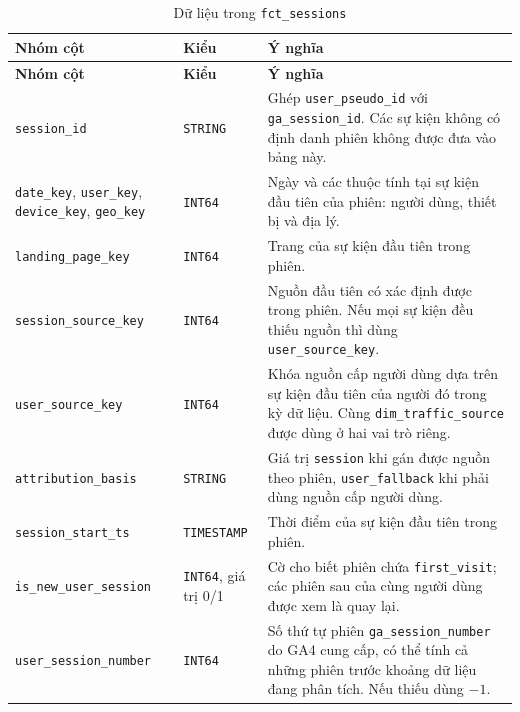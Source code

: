 \begin{xltabular}{\textwidth}{>{\raggedright\arraybackslash}p{4.5cm} >{\raggedright\arraybackslash}p{2.2cm} >{\raggedright\arraybackslash}X}
\caption{Dữ liệu trong \texttt{fct\_sessions}}
\label{tab:fct-sessions-detail} \\
\hline
\textbf{Nhóm cột} & \textbf{Kiểu} & \textbf{Ý nghĩa} \\
\hline
\endfirsthead
\hline
\textbf{Nhóm cột} & \textbf{Kiểu} & \textbf{Ý nghĩa} \\
\hline
\endhead
\hline
\endfoot
\hline
\endlastfoot

\texttt{session\_id}
& \texttt{STRING}
& Ghép \texttt{user\_pseudo\_id} với \texttt{ga\_session\_id}. Các sự kiện không có định danh phiên không được đưa vào bảng này. \\

\texttt{date\_key}, \texttt{user\_key}, \texttt{device\_key}, \texttt{geo\_key}
& \texttt{INT64}
& Ngày và các thuộc tính tại sự kiện đầu tiên của phiên: người dùng, thiết bị và địa lý. \\

\texttt{landing\_page\_key}
& \texttt{INT64}
& Trang của sự kiện đầu tiên trong phiên. \\

\texttt{session\_source\_key}
& \texttt{INT64}
& Nguồn đầu tiên có xác định được trong phiên. Nếu mọi sự kiện đều thiếu nguồn thì dùng \texttt{user\_source\_key}. \\

\texttt{user\_source\_key}
& \texttt{INT64}
& Khóa nguồn cấp người dùng dựa trên sự kiện đầu tiên của người đó trong kỳ dữ liệu. Cùng \texttt{dim\_traffic\_source} được dùng ở hai vai trò riêng. \\

\texttt{attribution\_basis}
& \texttt{STRING}
& Giá trị \texttt{session} khi gán được nguồn theo phiên, \texttt{user\_fallback} khi phải dùng nguồn cấp người dùng. \\

\texttt{session\_start\_ts}
& \texttt{TIMESTAMP}
& Thời điểm của sự kiện đầu tiên trong phiên. \\

\texttt{is\_new\_user\_session}
& \texttt{INT64}, giá trị 0/1
& Cờ cho biết phiên chứa \texttt{first\_visit}; các phiên sau của cùng người dùng được xem là quay lại. \\

\texttt{user\_session\_number}
& \texttt{INT64}
& Số thứ tự phiên \texttt{ga\_session\_number} do GA4 cung cấp, có thể tính cả những phiên trước khoảng dữ liệu đang phân tích. Nếu thiếu dùng $-1$. \\


\end{xltabular}

